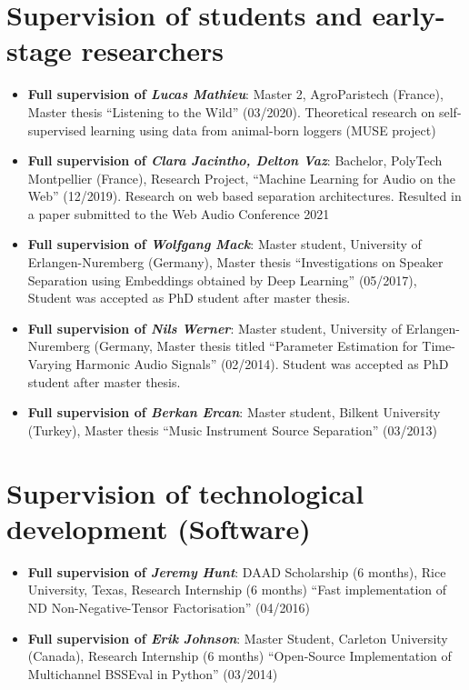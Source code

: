 \documentclass[a4paper,11pt]{article}
\newcommand{\resumeItem}[2]{
  \item\small{
    \textbf{#1}{: #2 \vspace{-2pt}}
  }
}
\newcommand{\resumeSubItem}[2]{\resumeItem{#1}{#2}\vspace{-4pt}}
\newcommand{\resumeSubHeadingListStart}{\begin{itemize}[leftmargin=*]}
\newcommand{\resumeSubHeadingListEnd}{\end{itemize}}
\begin{document}
\section{Supervision of students and early-stage researchers}
  \resumeSubHeadingListStart
    \resumeSubItem{Full supervision of \textit{Lucas Mathieu}}
    {Master 2, AgroParistech (France), Master thesis ``Listening to the Wild'' (03/2020). Theoretical research on self-supervised learning using data from animal-born loggers (MUSE project)}
    \resumeSubItem{Full supervision of \textit{Clara Jacintho, Delton Vaz}}
    {Bachelor, PolyTech Montpellier (France), Research Project, ``Machine Learning for Audio on the Web'' (12/2019). Research on web based separation architectures. Resulted in a paper submitted to the Web Audio Conference 2021}
    \resumeSubItem{Full supervision of \textit{Wolfgang Mack}}
    {Master student, University of Erlangen-Nuremberg (Germany), Master thesis ``Investigations on Speaker Separation using Embeddings obtained by Deep Learning'' (05/2017), Student was accepted as PhD student after master thesis.}
    \resumeSubItem{Full supervision of \textit{Nils Werner}}
    {Master student, University of Erlangen-Nuremberg (Germany, Master thesis titled ``Parameter Estimation for Time-Varying Harmonic Audio Signals'' (02/2014). Student was accepted as PhD student after master thesis.}
    \resumeSubItem{Full supervision of \textit{Berkan Ercan}}
    {Master student, Bilkent University (Turkey), Master thesis ``Music Instrument Source Separation'' (03/2013)}
  \resumeSubHeadingListEnd

\section{Supervision of technological development (Software)}
  \resumeSubHeadingListStart
    \resumeSubItem{Full supervision of \textit{Jeremy Hunt}}
    {DAAD Scholarship (6 months), Rice University, Texas, Research Internship (6 months) ``Fast implementation of ND Non-Negative-Tensor Factorisation'' (04/2016)}
    \resumeSubItem{Full supervision of \textit{Erik Johnson}}
    {Master Student, Carleton University (Canada), Research Internship (6 months) ``Open-Source Implementation of Multichannel BSSEval in Python'' (03/2014)}
  \resumeSubHeadingListEnd
\end{document}
